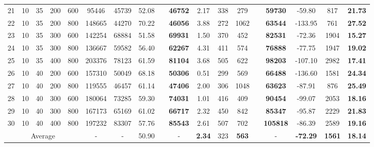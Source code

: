 \documentclass[11pt,nonblindrev,fleqn]{article}
\begin{document}
\begin{table}[H]
\begin{tabular}{cccccccccccccccccc}
21    & 10    & 35    & 200   & 600   & 95446 & 45739 & 52.08  &       & \textbf{46752 } & 2.17  & 338   & 279   &       & \textbf{59730} & -59.80  & 817   & \textbf{21.73 } \\
22    & 10    & 35    & 200   & 800   & 148665 & 44270 & 70.22  &       & \textbf{46056 } & 3.88  & 272   & 1062  &       & \textbf{63544} & -133.95  & 761   & \textbf{27.52 } \\
23    & 10    & 35    & 300   & 600   & 142254 & 68884 & 51.58  &       & \textbf{69931 } & 1.50  & 370   & 452   &       & \textbf{82531} & -72.36  & 1904  & \textbf{15.27 } \\
24    & 10    & 35    & 300   & 800   & 136667 & 59582 & 56.40  &       & \textbf{62267 } & 4.31  & 411   & 574   &       & \textbf{76888} & -77.75  & 1947  & \textbf{19.02 } \\
25    & 10    & 35    & 400   & 800   & 203376 & 78123 & 61.59  &       & \textbf{81104 } & 3.68  & 505   & 622   &       & \textbf{98203} & -107.10  & 2982  & \textbf{17.41 } \\
26    & 10    & 40    & 200   & 600   & 157310 & 50049 & 68.18  &       & \textbf{50306 } & 0.51  & 299   & 569   &       & \textbf{66488} & -136.60  & 1581  & \textbf{24.34 } \\
27    & 10    & 40    & 200   & 800   & 119555 & 46457 & 61.14  &       & \textbf{47406 } & 2.00  & 306   & 1048  &       & \textbf{63623} & -87.91  & 876   & \textbf{25.49 } \\
28    & 10    & 40    & 300   & 600   & 180064 & 73285 & 59.30  &       & \textbf{74031 } & 1.01  & 416   & 409   &       & \textbf{90454} & -99.07  & 2053  & \textbf{18.16 } \\
29    & 10    & 40    & 300   & 800   & 167173 & 65169 & 61.02  &       & \textbf{66717 } & 2.32  & 450   & 842   &       & \textbf{85347} & -95.87  & 2229  & \textbf{21.83 } \\
30    & 10    & 40    & 400   & 800   & 197232 & 83307 & 57.76  &       & \textbf{85543 } & 2.61  & 507   & 702   &       & \textbf{105818} & -86.39  & 2589  & \textbf{19.16 } \\
\multicolumn{5}{c}{Average}           & -     & -     & 50.90  &       & -     & \textbf{2.34 } & 323   & \textbf{563} &       & -     & \textbf{-72.29 } & \textbf{1561} & \textbf{18.14 } \bigstrut[b]\\
\hline
\end{tabular}%

\end{table}%
\end{document}
